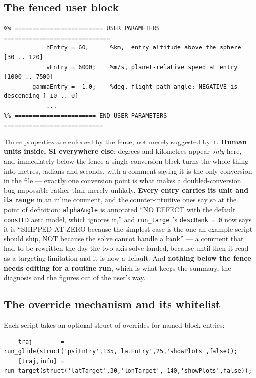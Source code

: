 \documentclass[11pt]{article}
\newcommand{\code}[1]{\texttt{#1}}
\begin{document}
\subsection{The fenced user block}

\begin{lstlisting}
%% ========================= USER PARAMETERS ==============================
            hEntry = 60;      %km,  entry altitude above the sphere [30 .. 120]
            vEntry = 6000;    %m/s, planet-relative speed at entry [1000 .. 7500]
        gammaEntry = -1.0;    %deg, flight path angle; NEGATIVE is descending [-10 .. 0]
            ...
%% ======================= END USER PARAMETERS ============================
\end{lstlisting}

Three properties are enforced by the fence, not merely suggested by it.
\textbf{Human units inside, SI everywhere else}: degrees and kilometres appear
\emph{only} here, and immediately below the fence a single conversion block
turns the whole thing into metres, radians and seconds, with a comment saying
it is the only conversion in the file --- exactly one conversion point is what
makes a doubled-conversion bug impossible rather than merely unlikely.
\textbf{Every entry carries its unit and its range} in an inline comment, and
the counter-intuitive ones say so at the point of definition:
\code{alphaAngle} is annotated ``NO EFFECT with the default \code{constLD} aero
model, which ignores it,'' and \code{run\_target}'s \code{descBank = 0} now
says it is ``SHIPPED AT ZERO because the simplest case is the one an example
script should ship, NOT because the solve cannot handle a bank'' --- a
comment that had to be rewritten the day the two-axis solve landed, because
until then it read as a targeting limitation and it is now a default. And
\textbf{nothing below the fence needs editing for
a routine run}, which is what keeps the summary, the diagnosis and the figures
out of the user's way.

\subsection{The override mechanism and its whitelist}

Each script takes an optional struct of overrides for named block entries:

\begin{lstlisting}
    traj        = run_glide(struct('psiEntry',135,'latEntry',25,'showPlots',false));
    [traj,info] = run_target(struct('latTarget',30,'lonTarget',-140,'showPlots',false));
\end{lstlisting}
\end{document}
